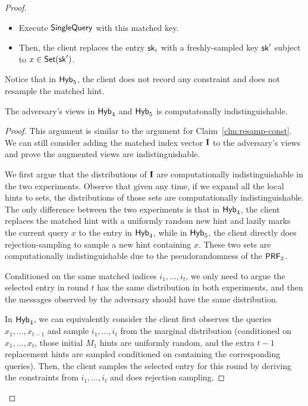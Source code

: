 \begin{proof}
\begin{itemize}
\begin{itemize}
            \item Execute $\mathsf{SingleQuery}$ with this matched key.
            
            \item Then, the client replaces the entry $\mathsf{sk}_i$ with a freshly-sampled key $\mathsf{sk}'$ subject to $x\in\mathsf{Set}(\mathsf{sk}')$.
            
        \end{itemize}
        
    \end{itemize}
    
    Notice that in ${\sf Hyb}_5$, the client does not record any constraint and does not resample the matched hint.
    
    \begin{myclaim}
        The adversary's views in ${\sf Hyb}_4$ and ${\sf Hyb}_5$ is computatonally indistinguishable.
    \end{myclaim}
    
    \begin{proof}
        This argument is similar to the argument for Claim~\ref{clm:resamp-const}. 
        We can still consider adding the matched index vector ${\bf I}$ to the adversary's views and prove the augmented views are indistinguishable.
        
        We first argue that the distributions of ${\bf I}$ are computationally indistinguishable in the two experiments.
        Observe that given any time, if we expand all the local hints to sets, the distributions of those sets are computationally indistinguishable. 
        The only difference between the two experiments is that in ${\sf Hyb}_4$, the client replaces the matched hint with a uniformly random new hint and lazily marks the current query $x$ to the entry in ${\sf Hyb}_4$, while in ${\sf Hyb}_5$, the client directly does rejection-sampling to sample a new hint containing $x$. 
        These two sets are computationally indistinguishable due to the pseudorandomness of the $\mathsf{PRF}_2$.
        
        Conditioned on the same matched indices $i_1,\dots,i_t$, we only need to argue the selected entry in round $t$ has the same distribution in both experiments, and then the messages observed by the adversary should have the same distribution.
        
        In ${\sf Hyb}_4$, we can equivalently consider the client first observes the queries $x_1,\dots,x_{t-1}$ and sample $i_1,\dots,i_t$ from the marginal distribution (conditioned on $x_1,\dots,x_t$, those initial $M_1$ hints are uniformly random, and the extra $t-1$ replacement hints are sampled conditioned on containing the corresponding queries).
        Then, the client samples the selected entry for this round by deriving the constraints from $i_1,\dots,i_t$ and does rejection sampling.
        

\end{proof}
\end{proof}
